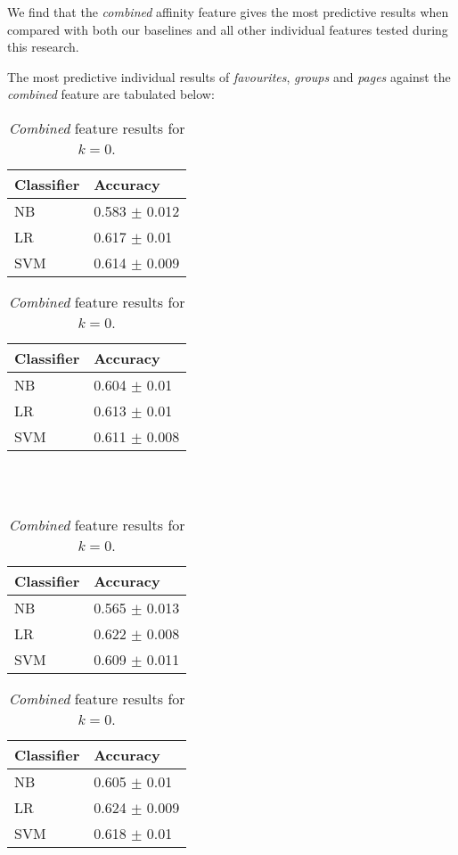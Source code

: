 We find that the \emph{combined} affinity feature gives the most predictive results when compared with both our baselines and all
other individual features tested during this research.

The most predictive individual results of \emph{favourites}, \emph{groups} and \emph{pages} against the \emph{combined}
feature are tabulated below:

\begin{table}[h]
\begin{minipage}[b]{.50\textwidth}
\centering
  \begin{tabular}{|l|l|} %
  \hline
  		\textbf{Classifier} & \textbf{Accuracy} \\ \hline
		NB & 0.583 $\pm$ 0.012 \\ \hline
		LR & 0.617 $\pm$ 0.01 \\ \hline
		SVM & 0.614 $\pm$ 0.009 \\ \hline
  \end{tabular}
  \caption{\emph{Favourite} feature results for $k=0$.}
\end{minipage}
\begin{minipage}[b]{.50\textwidth}
\centering
  \begin{tabular}{|l|l|} %
  \hline
  		\textbf{Classifier} & \textbf{Accuracy} \\ \hline
		NB & 0.604 $\pm$ 0.01 \\ \hline
		LR & 0.613 $\pm$ 0.01 \\ \hline
		SVM & 0.611 $\pm$ 0.008 \\ \hline
  \end{tabular}
  \caption{\emph{Pages} feature results for $k=0$.}
\end{minipage}
\\
\\
\begin{minipage}[b]{.50\textwidth}
\centering
  \begin{tabular}{|l|l|} %
  \hline
  		\textbf{Classifier} & \textbf{Accuracy} \\ \hline
		NB & 0.565 $\pm$ 0.013 \\ \hline
		LR & 0.622 $\pm$ 0.008 \\ \hline
		SVM & 0.609 $\pm$ 0.011 \\ \hline
  \end{tabular}
  \caption{\emph{Groups} feature results for $k=0$.}
\end{minipage}
\begin{minipage}[b]{.50\textwidth}
\centering
  \begin{tabular}{|l|l|} %
  \hline
  		\textbf{Classifier} & \textbf{Accuracy} \\ \hline
		NB & 0.605 $\pm$ 0.01 \\ \hline
		LR & 0.624 $\pm$ 0.009 \\ \hline
		SVM & 0.618 $\pm$ 0.01 \\ \hline
  \end{tabular}
  \caption{\emph{Combined} feature results for $k=0$.}
\end{minipage}
\end{table}

